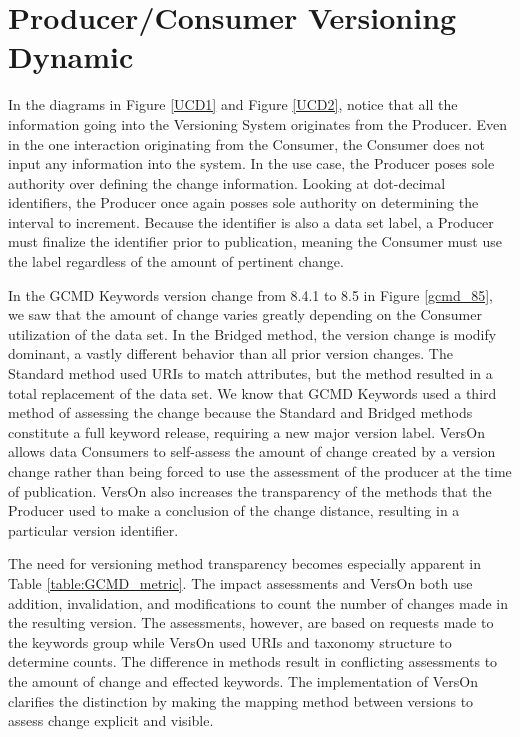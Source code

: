 \section{Producer/Consumer Versioning Dynamic}

In the diagrams in Figure \ref{UCD1} and Figure \ref{UCD2}, notice that all the information going into the Versioning System originates from the Producer.
Even in the one interaction originating from the Consumer, the Consumer does not input any information into the system.
In the use case, the Producer poses sole authority over defining the change information.
Looking at dot-decimal identifiers, the Producer once again posses sole authority on determining the interval to increment.
Because the identifier is also a data set label, a Producer must finalize the identifier prior to publication, meaning the Consumer must use the label regardless of the amount of pertinent change.

In the GCMD Keywords version change from 8.4.1 to 8.5 in Figure \ref{gcmd_85}, we saw that the amount of change varies greatly depending on the Consumer utilization of the data set.
In the Bridged method, the version change is \gls{modify} dominant, a vastly different behavior than all prior version changes.
The Standard method used URIs to match attributes, but the method resulted in a total replacement of the data set.
We know that GCMD Keywords used a third method of assessing the change because the Standard and Bridged methods constitute a full keyword release, requiring a new major version label.
VersOn allows data Consumers to self-assess the amount of change created by a version change rather than being forced to use the assessment of the producer at the time of publication.
VersOn also increases the transparency of the methods that the Producer used to make a conclusion of the change distance, resulting in a particular version identifier.

The need for versioning method transparency becomes especially apparent in Table \ref{table:GCMD_metric}.
The impact assessments and VersOn both use addition, invalidation, and modifications to count the number of changes made in the resulting version.
The assessments, however, are based on requests made to the keywords group while VersOn used URIs and taxonomy structure to determine counts.
The difference in methods result in conflicting assessments to the amount of change and effected keywords.
The implementation of VersOn clarifies the distinction by making the mapping method between versions to assess change explicit and visible.

